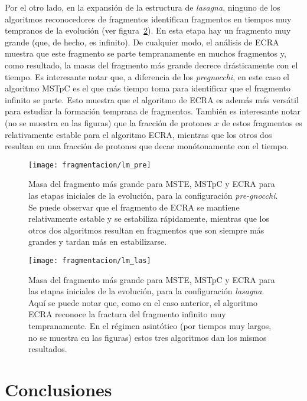 Por el otro lado, en la expansión de la estructura de \emph{lasagna}, ninguno de los algoritmos reconocedores de fragmentos identifican fragmentos en tiempos muy tempranos de la evolución (ver figura~\ref{fig:lm_las}).
En esta etapa hay un fragmento muy grande (que, de hecho, es infinito).
De cualquier modo, el análisis de ECRA muestra que este fragmento se parte tempranamente en muchos fragmentos y, como resultado, la masas del fragmento más grande decrece drásticamente con el tiempo.
Es interesante notar que, a diferencia de los \emph{pregnocchi}, en este caso el algoritmo MSTpC es el que más tiempo toma para identificar que el fragmento infinito se parte.
Esto muestra que el algoritmo de ECRA es además más versátil para estudiar la formación temprana de fragmentos.
También es interesante notar (no se muestra en las figuras) que la fracción de protones $x$ de estos fragmentos es relativamente estable para el algoritmo ECRA, mientras que los otros dos resultan en una fracción de protones que decae monótonamente con el tiempo.

\begin{figure}[H]  \centering
  \texttt{[image: fragmentacion/lm\_pre]}
  \caption{Masa del fragmento más grande para MSTE, MSTpC y ECRA para las etapas iniciales de la evolución, para la configuración \emph{pre-gnocchi}.
    Se puede observar que el fragmento de ECRA se mantiene relativamente estable y se estabiliza rápidamente, mientras que los otros dos algoritmos resultan en fragmentos que son siempre más grandes y tardan más en estabilizarse.}
\label{fig:lm_pre}
\end{figure}

\begin{figure}[H]  \centering
  \texttt{[image: fragmentacion/lm\_las]}
  \caption{Masa del fragmento más grande para MSTE, MSTpC y ECRA para las etapas iniciales de la evolución, para la configuración \emph{lasagna}.
    Aquí se puede notar que, como en el caso anterior, el algoritmo ECRA reconoce la fractura del fragmento infinito muy tempranamente.
    En el régimen asintótico (por tiempos muy largos, no se muestra en las figuras) estos tres algoritmos dan los mismos resultados.}
\label{fig:lm_las}
\end{figure}


\section{Conclusiones}

